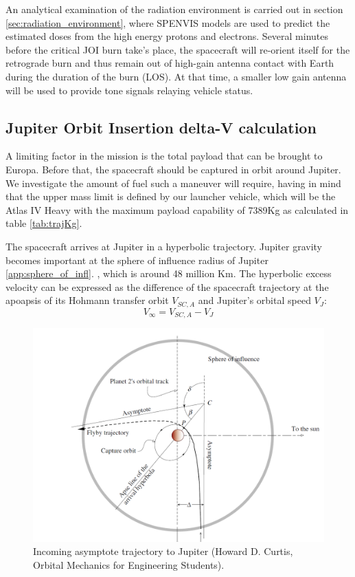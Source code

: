 An analytical examination of the radiation environment is carried out in section \ref{sec:radiation_environment}, where SPENVIS models are used to predict the estimated doses from the high energy protons and electrons. Several minutes before the critical JOI burn take’s place, the spacecraft will re-orient itself for the retrograde burn and thus remain out of high-gain antenna contact with Earth during the duration of the burn (LOS). At that time, a smaller low gain antenna will be used to provide tone signals relaying vehicle status. 
\subsection{Jupiter Orbit Insertion delta-V calculation}
A limiting factor in the mission is the total payload that can be brought to Europa. Before that, the spacecraft should be captured in orbit around Jupiter. We investigate the amount of fuel such a maneuver will require, having in mind that the upper mass limit is defined by our launcher vehicle, which will be the Atlas IV Heavy with the maximum payload capability of 7389Kg as calculated in table \ref{tab:trajKg}.

The spacecraft arrives at Jupiter in a hyperbolic trajectory. Jupiter gravity becomes important at the sphere of influence radius of Jupiter \ref{app:sphere_of_infl}.
, which is around 48 million Km. The hyperbolic excess velocity can be expressed as the difference of the spacecraft trajectory at the apoapsis of its Hohmann transfer orbit $V_{SC,A}$ and Jupiter’s orbital speed $V_J$:
\begin{equation}
V_\infty=V_{SC,A}-V_J
\end{equation}

\begin{figure}[htb]
\centering
\includegraphics[scale=0.3]{figures/Orbiter/capture.png}
\caption{Incoming asymptote trajectory to Jupiter (Howard D. Curtis, Orbital Mechanics for Engineering Students).\cite{orbitals}}
\label{fig:capture}
\end{figure}

